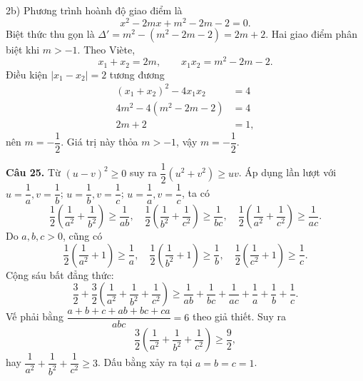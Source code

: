 \documentclass[12pt,a4paper]{article}
\begin{document}
2b) Phương trình hoành độ giao điểm là
\[
x^2-2mx+m^2-2m-2=0.
\]
Biệt thức thu gọn là $\Delta'=m^2-(m^2-2m-2)=2m+2$. Hai giao điểm phân biệt khi $m>-1$. Theo Viète,
\[
x_1+x_2=2m,\qquad x_1x_2=m^2-2m-2.
\]
Điều kiện $|x_1-x_2|=2$ tương đương
\begin{align*}
(x_1+x_2)^2-4x_1x_2&=4\\
4m^2-4(m^2-2m-2)&=4\\
2m+2&=1,
\end{align*}
nên $m=-\dfrac12$. Giá trị này thỏa $m>-1$, vậy $m=-\dfrac12$.

\textbf{Câu 25.} Từ $(u-v)^2\ge0$ suy ra $\dfrac12(u^2+v^2)\ge uv$. Áp dụng lần lượt với $u=\dfrac1a,v=\dfrac1b$; $u=\dfrac1b,v=\dfrac1c$; $u=\dfrac1a,v=\dfrac1c$, ta có
\[
\frac12\left(\frac1{a^2}+\frac1{b^2}\right)\ge\frac1{ab},\quad
\frac12\left(\frac1{b^2}+\frac1{c^2}\right)\ge\frac1{bc},\quad
\frac12\left(\frac1{a^2}+\frac1{c^2}\right)\ge\frac1{ac}.
\]
Do $a,b,c>0$, cũng có
\[
\frac12\left(\frac1{a^2}+1\right)\ge\frac1a,\quad
\frac12\left(\frac1{b^2}+1\right)\ge\frac1b,\quad
\frac12\left(\frac1{c^2}+1\right)\ge\frac1c.
\]
Cộng sáu bất đẳng thức:
\[
\frac32+\frac32\left(\frac1{a^2}+\frac1{b^2}+\frac1{c^2}\right)
\ge \frac1{ab}+\frac1{bc}+\frac1{ac}+\frac1a+\frac1b+\frac1c.
\]
Vế phải bằng $\dfrac{a+b+c+ab+bc+ca}{abc}=6$ theo giả thiết. Suy ra
\[
\frac32\left(\frac1{a^2}+\frac1{b^2}+\frac1{c^2}\right)\ge\frac92,
\]
hay $\dfrac1{a^2}+\dfrac1{b^2}+\dfrac1{c^2}\ge3$. Dấu bằng xảy ra tại $a=b=c=1$.
\end{document}
